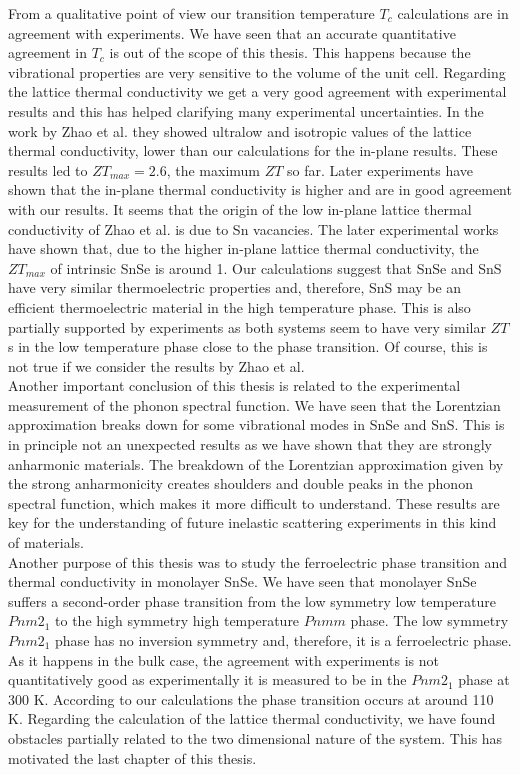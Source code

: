 From a qualitative point of view our transition temperature $T_{c}$ calculations are in agreement with experiments. 
We have seen that an accurate quantitative agreement in $T_{c}$ is out of the scope of this thesis. This happens 
because the vibrational properties are very sensitive to the volume of the unit cell. Regarding the lattice thermal 
conductivity we get a very good agreement with experimental results and this has helped clarifying many experimental 
uncertainties. In the work by Zhao et al.\cite{zhao2014ultralow} they showed ultralow and isotropic values of the 
lattice thermal conductivity, lower than our calculations for the in-plane results. These results led to 
$ZT_{max}=2.6$, the maximum $ZT$ so far. Later 
experiments\cite{ibrahim2017reinvestigation,wei2019thermoelectric} have shown that the in-plane thermal conductivity 
is higher and are in good agreement with our results. It seems that the origin of the low in-plane lattice thermal 
conductivity of Zhao et al. is due to Sn vacancies. The later experimental works have shown that, due to the higher 
in-plane lattice thermal conductivity, the $ZT_{max}$ of intrinsic SnSe is around 1. Our calculations suggest that 
SnSe and SnS have very similar thermoelectric properties and, therefore, SnS may be an efficient thermoelectric 
material in the high temperature phase. This is also partially supported by experiments as both systems seem to have 
very similar $ZT$s in the low temperature phase close to the phase transition. Of course, this is not true if we 
consider the results by Zhao et al. \\

Another important conclusion of this thesis is related to the experimental measurement of the phonon spectral 
function. We have seen that the Lorentzian approximation breaks down for some vibrational modes in SnSe and SnS. 
This is in principle not an unexpected results as we have shown that they are strongly anharmonic materials. The 
breakdown of the Lorentzian approximation given by the strong anharmonicity creates shoulders and double peaks in 
the phonon spectral function, which makes it more difficult to understand. These results are key for the 
understanding of future inelastic scattering experiments in this kind of materials. \\

Another purpose of this thesis was to study the ferroelectric phase transition and thermal conductivity in monolayer 
SnSe. We have seen that monolayer SnSe suffers a second-order phase transition from the low symmetry low temperature 
$Pnm2_{1}$ to the high symmetry high temperature $Pnmm$ phase. The low symmetry $Pnm2_{1}$ phase has no inversion 
symmetry and, therefore, it is a ferroelectric phase. As it happens in the bulk case, the agreement with 
experiments is not quantitatively good as experimentally it is measured to be in the $Pnm2_{1}$ phase at 300 K. 
According to our calculations the phase transition occurs at around 110 K. Regarding the calculation of the lattice 
thermal conductivity, we have found obstacles partially related to the two dimensional nature of the system. This has 
motivated the last chapter of this thesis. \\

